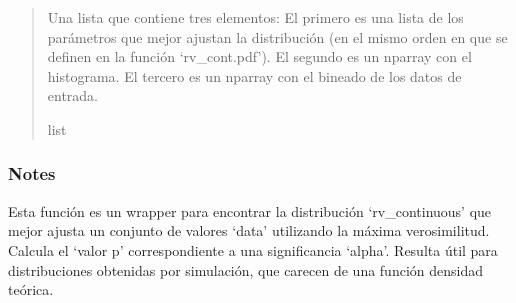 \documentclass[letterpaper,10pt,english]{sphinxmanual}
\begin{document}
\begin{fulllineitems}
\begin{quote}
\begin{description}
\begin{itemize}
\end{itemize}

\sphinxAtStartPar
Una lista que contiene tres elementos:
\sphinxhyphen{} El primero es una lista de los parámetros que mejor ajustan la distribución (en el mismo orden en que se definen en la función ‘rv\_cont.pdf’).
\sphinxhyphen{} El segundo es un nparray con el histograma.
\sphinxhyphen{} El tercero es un nparray con el bineado de los datos de entrada.

\sphinxAtStartPar
list

\end{description}\end{quote}
\subsubsection*{Notes}

\sphinxAtStartPar
Esta función es un wrapper para encontrar la distribución ‘rv\_continuous’ que mejor ajusta un conjunto de valores ‘data’ utilizando la máxima verosimilitud.
Calcula el ‘valor p’ correspondiente a una significancia ‘alpha’. Resulta útil para distribuciones obtenidas por simulación, que carecen de una función
densidad teórica.

\end{fulllineitems}

\end{document}
